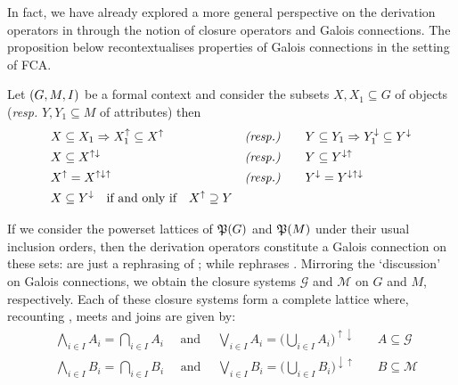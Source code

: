 In fact, we have already explored a more general perspective on the derivation operators
in  through the notion of closure operators and Galois
connections. The proposition below recontextualises properties of Galois
connections in the setting of FCA.

\begin{proposition}
	\label{proposition:derivation-operators-galois} Let $(G,M,\mathrel{I})$ be a formal context
	and consider the subsets $X,X_{1}\subseteq G$ of objects (\textit{resp.} $Y,Y_{1}
		\subseteq M$ of attributes) then
	\begin{align}
		 & X \subseteq X_{1}\Rightarrow X_{1}^{\uparrow}\subseteq X^{\uparrow} & \textit{(\textit{resp.})} & \qquad Y \subseteq Y_{1}\Rightarrow Y_{1}^{\downarrow}\subseteq Y^{\downarrow}\label{equation:galois-1} \\
		 & X \subseteq X^{\uparrow \downarrow}                                 & \textit{(\textit{resp.})} & \qquad Y \subseteq Y^{\downarrow \uparrow}\label{equation:galois-2}                                     \\
		 & X^{\uparrow}= X^{\uparrow \downarrow \uparrow}                      & \textit{(\textit{resp.})} & \qquad Y^{\downarrow}= Y^{\downarrow \uparrow \downarrow}\label{equation:galois-3}                      \\
		 & X \subseteq Y^{\downarrow}\quad \text{if and only if}\quad X^{\uparrow}\supseteq Y             & \label{equation:galois-4}
	\end{align}
\end{proposition}

If we consider the powerset lattices of $\mathfrak{P}({G})$ and $\mathfrak{P}({M})$ under their usual
inclusion orders, then the derivation operators constitute a Galois connection
on these sets:  are just
a rephrasing of ;
while  rephrases . Mirroring
the `discussion' on Galois connections, we obtain the closure systems
$\mathcal{G}$ and $\mathcal{M}$ on $G$ and $M$, respectively. Each of these
closure systems form a complete lattice where, recounting ,
meets and joins are given by:
%
\begin{align*}
	 & \underset{i \in I}\bigwedge A_{i}= \underset{i \in I}\bigcap A_{i}\quad \text{ and }\quad \underset{i \in I}\bigvee A_{i}= \big(\underset{i \in I}\bigcup A_{i}\big)^{\uparrow \downarrow} & \quad A\subseteq \mathcal{G} \\
	 & \underset{i \in I}\bigwedge B_{i}= \underset{i \in I}\bigcap B_{i}\quad \text{ and }\quad\underset{i \in I}\bigvee B_{i}= \big( \underset{i \in I}\bigcup B_{i}\big)^{\downarrow \uparrow} & \quad B\subseteq \mathcal{M}
\end{align*}

